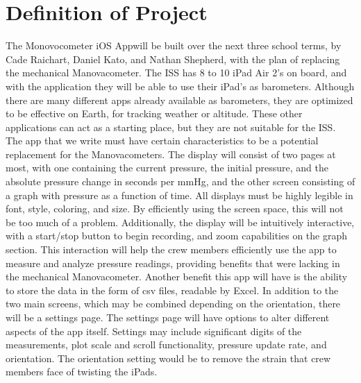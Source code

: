 \documentclass[onecolumn, draftclsnofoot,10pt, compsoc]{IEEEtran}
\def \GroupMemberOne{			Cade Raichart}
\def \GroupMemberTwo{			Daniel Kato}
\def \GroupMemberThree{			Nathan Shepherd}
\def \CapstoneProjectName{		Monovocometer iOS App}
\begin{document}
\section{Definition of Project}
The \CapstoneProjectName will be built over the next three school terms, by \GroupMemberOne, \GroupMemberTwo, and \GroupMemberThree, with the plan of replacing the mechanical Manovacometer.
The ISS has 8 to 10 iPad Air 2's on board, and with the application they will be able to use their iPad's as barometers.
Although there are many different apps already available as barometers, they are optimized to be effective on Earth, for tracking weather or altitude.
These other applications can act as a starting place, but they are not suitable for the ISS.
The app that we write must have certain characteristics to be a potential replacement for the Manovacometers.
The display will consist of two pages at most, with one containing the current pressure, the initial pressure, and the absolute pressure change in seconds per mmHg, and the other screen consisting of a graph with pressure as a function of time.
All displays must be highly legible in font, style, coloring, and size.
By efficiently using the screen space, this will not be too much of a problem.
Additionally, the display will be intuitively interactive, with a start/stop button to begin recording, and zoom capabilities on the graph section.
This interaction will help the crew members efficiently use the app to measure and analyze pressure readings, providing benefits that were lacking in the mechanical Manovacometer.
Another benefit this app will have is the ability to store the data in the form of csv files, readable by Excel.
In addition to the two main screens, which may be combined depending on the orientation, there will be a settings page.
The settings page will have options to alter different aspects of the app itself.
Settings may include significant digits of the measurements, plot scale and scroll functionality, pressure update rate, and orientation.
The orientation setting would be to remove the strain that crew members face of twisting the iPads. 
\end{document}

